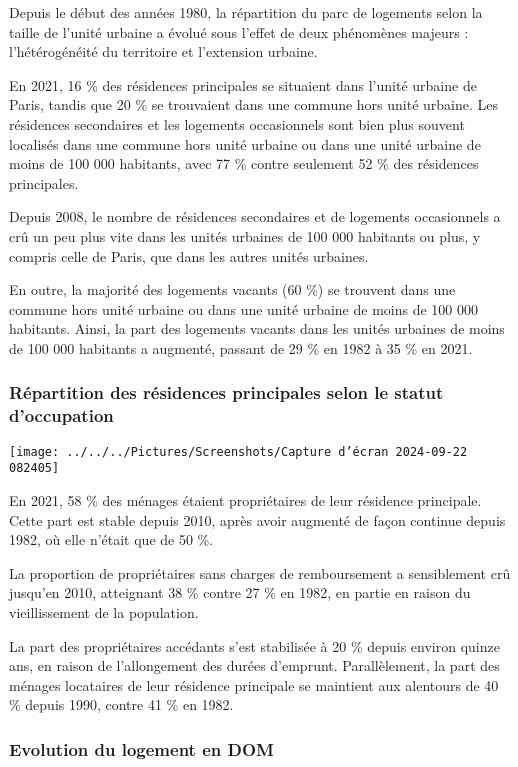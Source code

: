 \documentclass[a4paper, 12pt]{report}
\begin{document}
Depuis le début des années 1980, la répartition du parc de logements selon la taille de l’unité urbaine a évolué sous l’effet de deux phénomènes majeurs : l’hétérogénéité du territoire et l’extension urbaine. 

En 2021, 16 \% des résidences principales se situaient dans l’unité urbaine de Paris, tandis que 20 \% se trouvaient dans une commune hors unité urbaine. Les résidences secondaires et les logements occasionnels sont bien plus souvent localisés dans une commune hors unité urbaine ou dans une unité urbaine de moins de 100 000 habitants, avec 77 \% contre seulement 52 \% des résidences principales. 

Depuis 2008, le nombre de résidences secondaires et de logements occasionnels a crû un peu plus vite dans les unités urbaines de 100 000 habitants ou plus, y compris celle de Paris, que dans les autres unités urbaines. 

En outre, la majorité des logements vacants (60 \%) se trouvent dans une commune hors unité urbaine ou dans une unité urbaine de moins de 100 000 habitants. Ainsi, la part des logements vacants dans les unités urbaines de moins de 100 000 habitants a augmenté, passant de 29 \% en 1982 à 35 \% en 2021.
\subsubsection{Répartition des résidences principales selon le statut d'occupation}

\begin{center}
	\texttt{[image: ../../../Pictures/Screenshots/Capture d'écran 2024-09-22 082405]}
\end{center}

En 2021, 58 \% des ménages étaient propriétaires de leur résidence principale. Cette part est stable depuis 2010, après avoir augmenté de façon continue depuis 1982, où elle n'était que de 50 \%. 

La proportion de propriétaires sans charges de remboursement a sensiblement crû jusqu’en 2010, atteignant 38 \% contre 27 \% en 1982, en partie en raison du vieillissement de la population.
 
La part des propriétaires accédants s’est stabilisée à 20 \% depuis environ quinze ans, en raison de l’allongement des durées d’emprunt. Parallèlement, la part des ménages locataires de leur résidence principale se maintient aux alentours de 40 \% depuis 1990, contre 41 \% en 1982.

\subsubsection{Evolution du logement en DOM}
\end{document}
